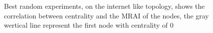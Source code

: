 \documentclass[10pt,conference,letterpaper]{IEEEtran}
\newcommand{\figvspace}{-1.5em}
\begin{document}
\begin{figure}[tb]
	\caption{Best random experiments, on the internet like topology, shows the 
			 correlation between centrality and the \ac{MRAI} of the nodes, the
			 gray wertical line represent the first node with centrality of 0}
	\label{fig:random_study}
	\vspace{\figvspace}
\end{figure}




\end{document}

